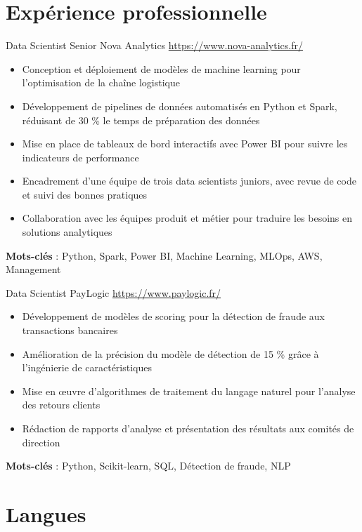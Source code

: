 \documentclass[a4paper, serif, 10pt]{moderncv}
\begin{document}
\section{Expérience professionnelle}

        {Data Scientist Senior}
        {Nova Analytics}
        {\url{https://www.nova-analytics.fr/}}
        {}
        {\begin{itemize}
\item Conception et déploiement de modèles de machine learning pour l'optimisation de la chaîne logistique
\item Développement de pipelines de données automatisés en Python et Spark, réduisant de 30 \% le temps de préparation des données
\item Mise en place de tableaux de bord interactifs avec Power BI pour suivre les indicateurs de performance
\item Encadrement d'une équipe de trois data scientists juniors, avec revue de code et suivi des bonnes pratiques
\item Collaboration avec les équipes produit et métier pour traduire les besoins en solutions analytiques
\end{itemize}
\textbf{Mots-clés} : Python, Spark, Power BI, Machine Learning, MLOps, AWS, Management}

        {Data Scientist}
        {PayLogic}
        {\url{https://www.paylogic.fr/}}
        {}
        {\begin{itemize}
\item Développement de modèles de scoring pour la détection de fraude aux transactions bancaires
\item Amélioration de la précision du modèle de détection de 15 \% grâce à l'ingénierie de caractéristiques
\item Mise en œuvre d'algorithmes de traitement du langage naturel pour l'analyse des retours clients
\item Rédaction de rapports d'analyse et présentation des résultats aux comités de direction
\end{itemize}
\textbf{Mots-clés} : Python, Scikit-learn, SQL, Détection de fraude, NLP}
\section{Langues}

\end{document}
